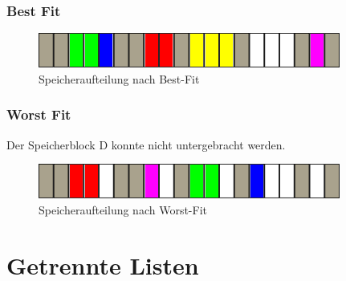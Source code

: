 \documentclass[DIN, pagenumber=false, fontsize=11pt, parskip=half]{scrartcl}
\begin{document}
    \subsubsection{Best Fit}
    \begin{figure}[H]
        \centering
        \includegraphics[width=\textwidth]{bestFit.png}
        \caption{Speicheraufteilung nach Best-Fit}
    \end{figure}
    \subsubsection{Worst Fit}
    Der Speicherblock D konnte nicht untergebracht werden.
    \begin{figure}[H]
        \centering
        \includegraphics[width=\textwidth]{worstFit.png}
        \caption{Speicheraufteilung nach Worst-Fit}
    \end{figure}

    \section{Getrennte Listen}
\end{document}
